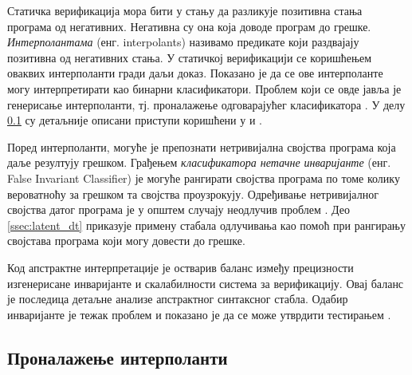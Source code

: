 \documentclass[a4paper]{article}
\begin{document}
{Статичка верификација мора бити у стању да разликује позитивна стања програма од негативних.
Негативна су она која доводе програм до грешке. \textit{Интерполантама} (енг. interpolants)
називамо предикате који раздвајају позитивна од негативних стања.
У статичкој верификацији се коришћењем оваквих интерполанти гради даљи доказ.
Показано је да се ове интерполанте могу интерпретирати као бинарни класификатори.
Проблем који се овде јавља је генерисање интерполанти, тј. проналажење одговарајућег класификатора \cite{Sharma_interpolantsas}.
У делу  \ref{ssec:interpolant} су детаљније описани приступи коришћени у \cite{Sharma_interpolantsas} и \cite{KrishnaPW15}.

Поред интерполанти, могуће је препознати нетривијална својства програма која даље резултују грешком.
Грађењем \textit{класификатора нетачне инваријанте} (енг. False Invariant Classifier) је могуће рангирати
својства програма по томе колику вероватноћу за грешком та својства проузрокују.
Одређивање нетривијалног својства датог програма је у општем случају неодлучив проблем \cite{Brun04findinglatent, turing}.
Део \ref{ssec:latent_dt} приказује примену стабала одлучивања као помоћ при рангирању својстава програма који могу
довести до грешке.

Код апстрактне интерпретације је остварив баланс између прецизности изгенерисане инваријанте и скалабилности система за верификацију. Овај баланс је последица детаљне анализе апстрактног синтаксног стабла. Одабир инваријанте је тежак проблем и показано је да се може утврдити тестирањем \cite{KrishnaPW15, Sharma_interpolantsas}.


\label{sec:primene}

\subsection{Проналажење интерполанти}
\label{ssec:interpolant}

}
\end{document}
